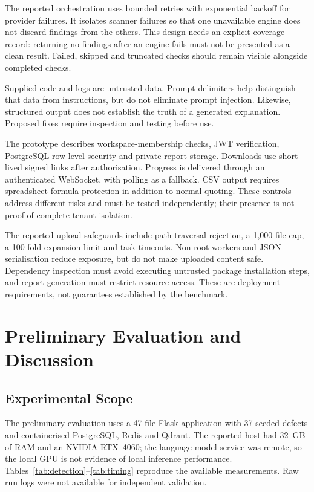 \documentclass[conference,letterpaper]{IEEEtran}
\begin{document}
The reported orchestration uses bounded retries with exponential backoff for provider failures. It isolates scanner failures so that one unavailable engine does not discard findings from the others. This design needs an explicit coverage record: returning no findings after an engine fails must not be presented as a clean result. Failed, skipped and truncated checks should remain visible alongside completed checks.

Supplied code and logs are untrusted data. Prompt delimiters help distinguish that data from instructions, but do not eliminate prompt injection. Likewise, structured output does not establish the truth of a generated explanation. Proposed fixes require inspection and testing before use.

The prototype describes workspace-membership checks, JWT verification, PostgreSQL row-level security and private report storage. Downloads use short-lived signed links after authorisation. Progress is delivered through an authenticated WebSocket, with polling as a fallback. CSV output requires spreadsheet-formula protection in addition to normal quoting. These controls address different risks and must be tested independently; their presence is not proof of complete tenant isolation.

The reported upload safeguards include path-traversal rejection, a 1,000-file cap, a 100-fold expansion limit and task timeouts. Non-root workers and JSON serialisation reduce exposure, but do not make uploaded content safe. Dependency inspection must avoid executing untrusted package installation steps, and report generation must restrict resource access. These are deployment requirements, not guarantees established by the benchmark.

\section{Preliminary Evaluation and Discussion}
\subsection{Experimental Scope}
The preliminary evaluation uses a 47-file Flask application with 37 seeded defects and containerised PostgreSQL, Redis and Qdrant. The reported host had 32~GB of RAM and an NVIDIA RTX~4060; the language-model service was remote, so the local GPU is not evidence of local inference performance. Tables~\ref{tab:detection}--\ref{tab:timing} reproduce the available measurements. Raw run logs were not available for independent validation.
\end{document}
